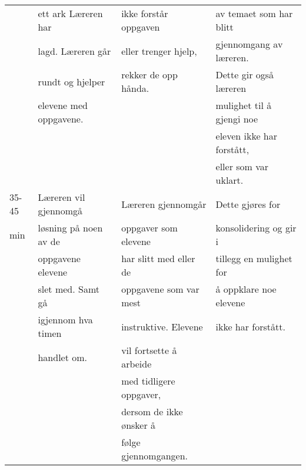 \documentclass{article}
\begin{document}
\begin{center}
\begin{tabular}{l|l|l|l}
 & ett ark Læreren har & ikke forstår oppgaven & av temaet som har blitt\\
 & lagd. Læreren går & eller trenger hjelp, & gjennomgang av læreren.\\
 & rundt og hjelper & rekker de opp hånda. & Dette gir også læreren\\
 & elevene med oppgavene. &  & mulighet til å gjengi noe\\
 &  &  & eleven ikke har forstått,\\
 &  &  & eller som  var uklart.\\
\hline
35-45 & Læreren vil gjennomgå & Læreren gjennomgår & Dette gjøres for\\
min & løsning på noen av de & oppgaver som elevene & konsolidering og gir i\\
 & oppgavene elevene & har slitt med eller de & tillegg en mulighet for\\
 & slet med. Samt gå & oppgavene som var mest & å oppklare noe elevene\\
 & igjennom hva timen & instruktive. Elevene & ikke har forstått.\\
 & handlet om. & vil fortsette å arbeide & \\
 &  & med tidligere oppgaver, & \\
 &  & dersom de ikke ønsker å & \\
 &  & følge gjennomgangen. & \\
\end{tabular}
\end{center}
\newpage
\end{document}
